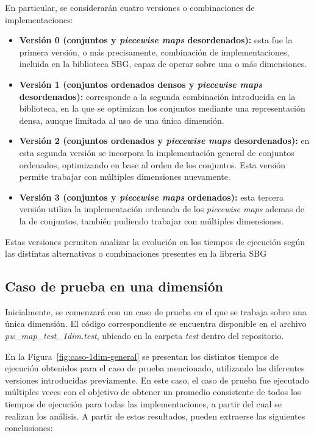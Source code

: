 En particular, se considerarán cuatro versiones o combinaciones de implementaciones:

\begin{itemize}
    \item \textbf{Versión 0 (conjuntos y \textit{piecewise maps} desordenados):} esta fue la primera versión, o más precisamente, combinación de implementaciones, incluida en la biblioteca SBG, capaz de operar sobre una o más dimensiones.

    \item \textbf{Versión 1 (conjuntos ordenados densos y \textit{piecewise maps} desordenados):} corresponde a la segunda combinación introducida en la biblioteca, en la que se optimizan los conjuntos mediante una representación densa, aunque limitada al uso de una única dimensión.

    \item \textbf{Versión 2 (conjuntos ordenados y \textit{piecewise maps} desordenados):} en esta segunda versión se incorpora la implementación general de conjuntos ordenados, optimizando en base al orden de los conjuntos. Esta versión permite trabajar con múltiples dimensiones nuevamente.

    \item \textbf{Versión 3 (conjuntos y \textit{piecewise maps} ordenados):} esta tercera versión utiliza la implementación ordenada de los \textit{piecewise maps} ademas de la de conjuntos, también pudiendo trabajar con múltiples dimensiones.
\end{itemize}

Estas versiones permiten analizar la evolución en los tiempos de ejecución según las distintas alternativas o combinaciones presentes en la libreria SBG

\subsection{Caso de prueba en una dimensión}

Inicialmente, se comenzará con un caso de prueba en el que se trabaja sobre una única dimensión. El código correspondiente se encuentra disponible en el archivo \textit{pw\_map\_test\_1dim.test}, ubicado en la carpeta \textit{test} dentro del repositorio.

En la Figura~\ref{fig:caso-1dim-general} se presentan los distintos tiempos de ejecución obtenidos para el caso de prueba mencionado, utilizando las diferentes versiones introducidas previamente. En este caso, el caso de prueba fue ejecutado múltiples veces con el objetivo de obtener un promedio consistente de todos los tiempos de ejecución para todas las implementaciones, a partir del cual se realizan los análisis. A partir de estos resultados, pueden extraerse las siguientes conclusiones:


